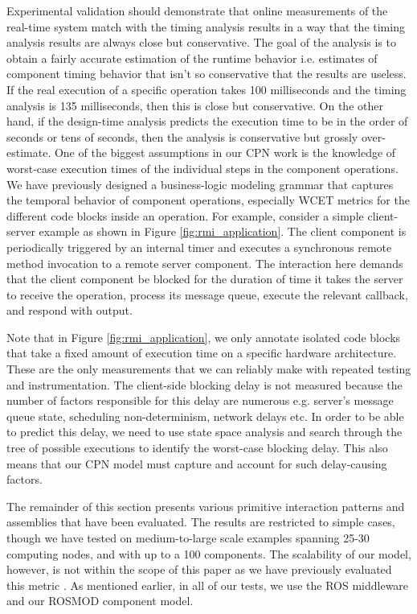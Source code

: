 Experimental validation should demonstrate that online measurements of the real-time system match with the timing analysis results in a way that the timing analysis results are always close but conservative. The goal of the analysis is to obtain a fairly accurate estimation of the runtime behavior i.e. estimates of component timing behavior that isn't so conservative that the results are useless. If the real execution of a specific operation takes 100 milliseconds and the timing analysis is 135 milliseconds, then this is close but conservative. On the other hand, if the design-time analysis predicts the execution time to be in the order of seconds or tens of seconds, then the analysis is conservative but grossly over-estimate. One of the biggest assumptions in our CPN work is the knowledge of worst-case execution times of the individual steps in the component operations. We have previously designed \cite{SEUS} a business-logic modeling grammar that captures the temporal behavior of component operations, especially WCET metrics for the different code blocks inside an operation. For example, consider a simple client-server example as shown in Figure \ref{fig:rmi_application}. The client component is periodically triggered by an internal timer and executes a synchronous remote method invocation to a remote server component. The interaction here demands that the client component be blocked for the duration of time it takes the server to receive the operation, process its message queue, execute the relevant callback, and respond with output. 

Note that in Figure \ref{fig:rmi_application}, we only annotate isolated code blocks that take a fixed amount of execution time on a specific hardware architecture. These are the only measurements that we can reliably make with repeated testing and instrumentation. The client-side blocking delay is not measured because the number of factors responsible for this delay are numerous e.g. server's message queue state, scheduling non-determinism, network delays etc. In order to be able to predict this delay, we need to use state space analysis and search through the tree of possible executions to identify the worst-case blocking delay. This also means that our CPN model must capture and account for such delay-causing factors. 

The remainder of this section presents various primitive interaction patterns and assemblies that have been evaluated. The results are restricted to simple cases, though we have tested on medium-to-large scale examples spanning 25-30 computing nodes, and with up to a 100 components. The scalability of our model, however, is not within the scope of this paper as we have previously evaluated this metric \cite{SEUS}. As mentioned earlier, in all of our tests, we use the ROS \cite{ROS} middleware and our ROSMOD \cite{kumarROSMOD} component model. 

